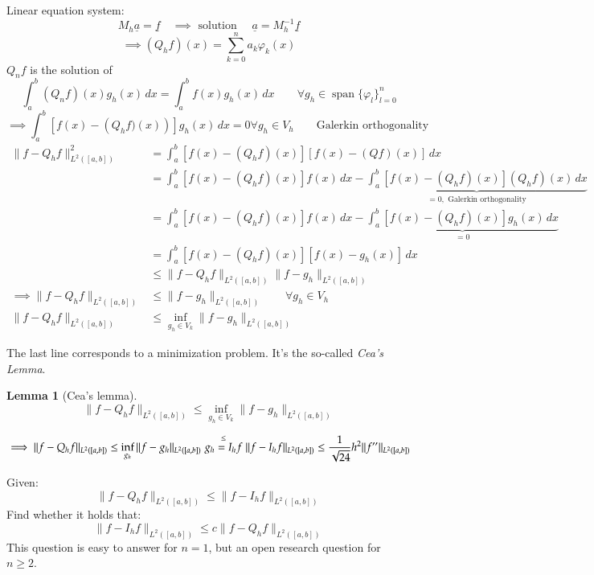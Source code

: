 \documentclass{article}
\newtheorem*{lemma}{Lemma}
\begin{document}
Linear equation system:
\[ M_h \underline{a} = \underline{f} \quad \implies \text{ solution } \quad \underline{a} = M_h^{-1} \underline{f} \]
\[ \implies (Q_h f)(x) = \sum_{k=0}^n a_k \varphi_k(x) \]
$Q_n f$ is the solution of
\[ \int_a^b \left(Q_n f\right)(x) g_h(x) \, dx = \int_a^b f(x) g_h(x) \, dx \qquad \forall g_h \in \operatorname{span}\{\varphi_l\}^n_{l=0} \]
\[ \implies \int_a^b \left[f(x) - \left(Q_h f)(x)\right)\right] g_h(x) \, dx = 0 \forall g_h \in V_h \qquad \text{Galerkin orthogonality} \]
\begin{align*}
  \| f - Q_h f \|^2_{L^2([a,b])}
    &= \int_a^b \left[ f(x) - (Q_h f)(x) \right] \left[ f(x) - (Q f)(x) \right] \, dx \\
    &= \int_a^b \left[ f(x) - (Q_h f)(x) \right] f(x) \, dx - \underbrace{\int_a^b \left[f(x) - (Q_h f)(x)\right] (Q_h f)(x) \, dx}_{=0, \text{ Galerkin orthogonality}} \\
    &= \int_a^b \left[f(x) - (Q_h f)(x)\right] f(x) \, dx - \underbrace{\int_a^b \left[f(x) - (Q_h f)(x)\right] g_h(x) \, dx}_{=0} \\
    &= \int_a^b \left[f(x) - (Q_h f)(x)\right] \left[f(x) - g_h(x)\right] \, dx \\
    &\leq \| f - Q_h f \|_{L^2([a,b])} \| f - g_h \|_{L^2([a,b])} \\
  \implies \| f - Q_h f \|_{L^2([a,b])} &\leq \|f - g_h\|_{L^2([a,b])} \qquad \forall g_h \in V_h \\
  \| f - Q_h f \|_{L^2([a,b])} &\leq \inf_{g_h \in V_k} \| f - g_h \|_{L^2([a,b])}
\end{align*}

The last line corresponds to a minimization problem.
It's the so-called \emph{Cea's Lemma}.

\begin{lemma}[Cea's lemma]
  \[ \| f - Q_h f \|_{L^2([a,b])} \leq \inf_{g_h \in V_k} \| f - g_h \|_{L^2([a,b])} \]
\end{lemma}

\[
  \implies \|f - Q_h f \|_{L^2([a,b])} \leq \inf_{g_h} \| f - g_h \|_{L^2([a,b])} \\
    \stackrel{\leq}{g_h = I_h f} \|f - I_h f \|_{L^2([a,b])}
    \leq \frac{1}{\sqrt{24}} h^2 \| f'' \|_{L^2([a,b])}
\]

Given:
\[ \| f - Q_h f \|_{L^2([a,b])} \leq \| f - I_h f \|_{L^2([a,b])} \]
Find whether it holds that:
\[ \| f - I_h f \|_{L^2([a,b])} \leq c \|f - Q_h f \|_{L^2([a,b])} \]
This question is easy to answer for $n=1$, but an open research question for $n\geq 2$.
\end{document}
